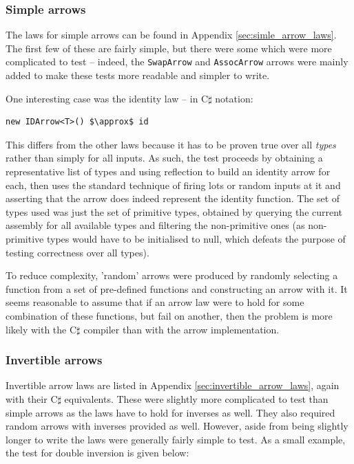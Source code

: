 \documentclass[12pt,twoside,notitlepage]{report}
\begin{document}
\subsubsection{Simple arrows}

The laws for simple arrows can be found in Appendix \ref{sec:simle_arrow_laws}. The first few of these are fairly simple, but there were some which were more complicated to test -- indeed, the \texttt{SwapArrow} and \texttt{AssocArrow} arrows were mainly added to make these tests more readable and simpler to write.

One interesting case was the identity law -- in C$\sharp$ notation:

\begin{lstlisting}[mathescape]
new IDArrow<T>() $\approx$ id
\end{lstlisting}

This differs from the other laws because it has to be proven true over all \textit{types} rather than simply for all inputs. As such, the test proceeds by obtaining a representative list of types and using reflection to build an identity arrow for each, then uses the standard technique of firing lots or random inputs at it and asserting that the arrow does indeed represent the identity function. The set of types used was just the set of primitive types, obtained by querying the current assembly for all available types and filtering the non-primitive ones (as non-primitive types would have to be initialised to null, which defeats the purpose of testing correctness over all types).

To reduce complexity, 'random' arrows were produced by randomly selecting a function from a set of pre-defined functions and constructing an arrow with it. It seems reasonable to assume that if an arrow law were to hold for some combination of these functions, but fail on another, then the problem is more likely with the C$\sharp$ compiler than with the arrow implementation.

\subsubsection{Invertible arrows}

Invertible arrow laws are listed in Appendix \ref{sec:invertible_arrow_laws}, again with their C$\sharp$ equivalents. These were slightly more complicated to test than simple arrows as the laws have to hold for inverses as well. They also required random arrows with inverses provided as well. However, aside from being slightly longer to write the laws were generally fairly simple to test. As a small example, the test for double inversion is given below:
\end{document}
